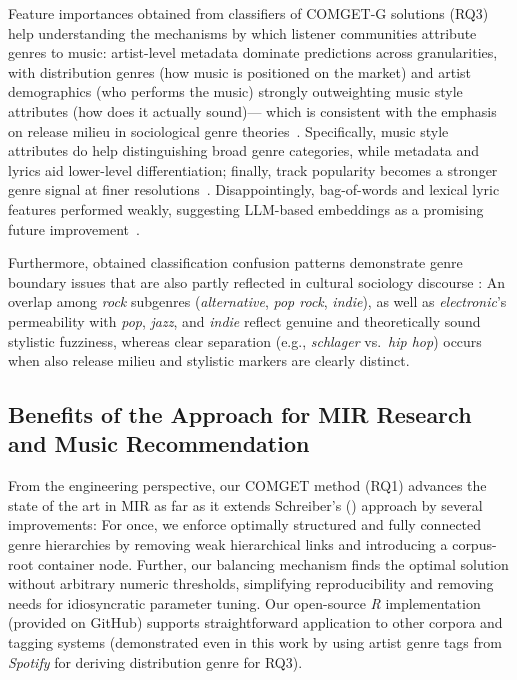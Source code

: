 \documentclass{article}
\begin{document}
Feature importances obtained from classifiers of COMGET-G solutions (RQ3) help understanding the mechanisms by which listener communities attribute genres to music: artist-level metadata dominate predictions across granularities, with distribution genres (how music is positioned on the market) and artist demographics (who performs the music) strongly  outweighting music style attributes (how does it actually sound)— which is consistent with the emphasis on release milieu in sociological genre theories~\citep{nealeGenre1980}. Specifically, music style attributes do help distinguishing broad genre categories, while metadata and lyrics aid lower-level differentiation; finally, track popularity becomes a stronger genre signal at finer resolutions~\citep{holtGenrePopularMusic2007}. Disappointingly, bag-of-words and lexical lyric features performed weakly, suggesting LLM-based embeddings as a promising future improvement~\citep{prevedelloLyricsSuccessEmbedding2024}. 

Furthermore, obtained classification confusion patterns demonstrate genre boundary issues that are also partly reflected in cultural sociology discourse \citet{silverGenreComplexesPopular2016} : An overlap among \textit{rock} subgenres (\textit{alternative}, \textit{pop rock}, \textit{indie}), as well as \textit{electronic}'s permeability with \textit{pop}, \textit{jazz}, and \textit{indie} reflect genuine and theoretically sound stylistic fuzziness, whereas clear separation (e.g., \textit{schlager} vs.\ \textit{hip hop}) occurs when also release milieu and stylistic markers are clearly distinct.
 


\subsection{Benefits of the Approach for MIR Research and Music Recommendation}

From the engineering perspective, our COMGET method (RQ1) advances the state of the art in MIR as far as it extends Schreiber's (\citeyear{schreiberImprovingGenreAnnotations2015}) approach by several improvements: For once, we enforce optimally structured and fully connected genre hierarchies by removing weak hierarchical links and introducing a corpus-root container node. Further, our balancing mechanism finds the optimal solution without arbitrary numeric thresholds, simplifying reproducibility and removing needs for idiosyncratic parameter tuning. Our open-source \textit{R} implementation (provided on GitHub) supports straightforward application to other corpora and tagging systems (demonstrated even in this work by using artist genre tags from \textit{Spotify} for deriving distribution genre for RQ3).
\end{document}
